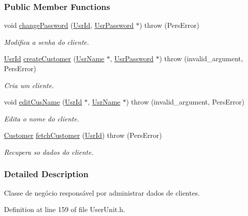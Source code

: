 \subsubsection*{Public Member Functions}
\begin{DoxyCompactItemize}
\item 
void \hyperlink{classCtrlUserCusAdm_a824dda2b1f70cb6c855b0f0741cf1ae3}{change\-Password} (\hyperlink{classUsrId}{Usr\-Id}, \hyperlink{classUsrPassword}{Usr\-Password} $\ast$)  throw (\-Pers\-Error)
\begin{DoxyCompactList}\small\item\em Modifica a senha do cliente. \end{DoxyCompactList}\item 
\hyperlink{classUsrId}{Usr\-Id} \hyperlink{classCtrlUserCusAdm_acaef9cd1fb9a32deff009e1ddc2c7a5f}{create\-Customer} (\hyperlink{classUsrName}{Usr\-Name} $\ast$, \hyperlink{classUsrPassword}{Usr\-Password} $\ast$)  throw (invalid\-\_\-argument, Pers\-Error)
\begin{DoxyCompactList}\small\item\em Cria um cliente. \end{DoxyCompactList}\item 
void \hyperlink{classCtrlUserCusAdm_a4155af77de74ea82bcd54cd2ac23daed}{edit\-Cus\-Name} (\hyperlink{classUsrId}{Usr\-Id} $\ast$, \hyperlink{classUsrName}{Usr\-Name} $\ast$)  throw (invalid\-\_\-argument, Pers\-Error)
\begin{DoxyCompactList}\small\item\em Edita o nome do cliente. \end{DoxyCompactList}\item 
\hyperlink{classCustomer}{Customer} \hyperlink{classCtrlUserCusAdm_a63722fe2ad890dfbafc6bf8104ab51f2}{fetch\-Customer} (\hyperlink{classUsrId}{Usr\-Id})  throw (\-Pers\-Error)
\begin{DoxyCompactList}\small\item\em Recupera so dados do cliente. \end{DoxyCompactList}\end{DoxyCompactItemize}


\subsubsection{Detailed Description}
Classe de negócio responsável por administrar dados de clientes. 

Definition at line 159 of file User\-Unit.\-h.



